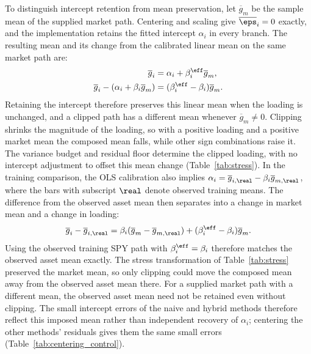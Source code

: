 To distinguish intercept retention from mean preservation, let
$\overline{g}_m$ be the sample mean of the supplied market path.
Centering and scaling give $\overline{\eps}_i=0$ exactly, and the
implementation retains the fitted intercept $\alpha_i$ in every
branch. The resulting mean and its change from the calibrated linear
mean on the same market path are:
\begin{align}
  \overline{g}_i
    &= \alpha_i+\beta_i^{\eff}\overline{g}_m, \notag\\
  \overline{g}_i-(\alpha_i+\beta_i\overline{g}_m)
    &= (\beta_i^{\eff}-\beta_i)\overline{g}_m.
  \label{eq:supp-clipped-mean}
\end{align}
Retaining the intercept therefore preserves this linear mean when the
loading is unchanged, and a clipped path has a different mean whenever
$\overline{g}_m\ne0$. Clipping shrinks the magnitude of the loading,
so with a positive loading and a positive market mean the composed
mean falls, while other sign combinations raise it. The variance
budget and residual floor determine the clipped loading, with no
intercept adjustment to offset this mean change
(Table~\ref{tab:stress}). In the training comparison, the OLS
calibration also implies
$\alpha_i=\overline{g}_{i,\real}-\beta_i\overline{g}_{m,\real}$,
where the bars with subscript $\real$ denote observed training means.
The difference from the observed asset mean then separates into a
change in market mean and a change in loading:
\begin{equation}
  \overline{g}_i-\overline{g}_{i,\real}
  = \beta_i(\overline{g}_m-\overline{g}_{m,\real})
    +(\beta_i^{\eff}-\beta_i)\overline{g}_m.
  \label{eq:supp-training-mean-shift}
\end{equation}
Using the observed training SPY path with $\beta_i^{\eff}=\beta_i$
therefore matches the observed asset mean exactly. The stress
transformation of Table~\ref{tab:stress} preserved the market mean, so
only clipping could move the composed mean away from the observed
asset mean there. For a supplied market path with a different mean,
the observed asset mean need not be retained even without clipping.
The small intercept errors of the naive and hybrid methods therefore
reflect this imposed mean rather than independent recovery of
$\alpha_i$; centering the other methods' residuals gives them the
same small errors (Table~\ref{tab:centering_control}).

